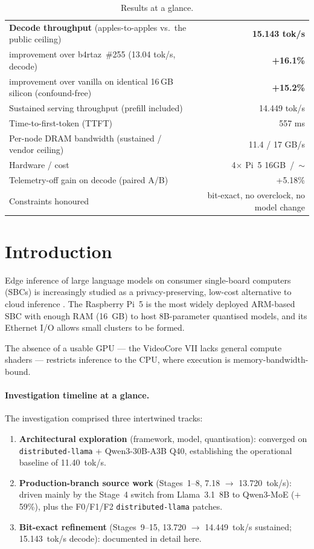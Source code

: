 \documentclass[10pt,a4paper]{article}
\providecommand{\euro}{}\renewcommand{\euro}{\texteuro}
\begin{document}
\begin{table}[h]
\centering
\small
\caption{Results at a glance.}
\begin{tabular}{@{}lr@{}}
\toprule
\textbf{Decode throughput} (apples-to-apples vs.\ the public ceiling) & \textbf{15.143 tok/s} \\
\quad improvement over b4rtaz~\#255 (13.04 tok/s, decode) & \textbf{+16.1\%} \\
\quad improvement over vanilla on identical 16\,GB silicon (confound-free) & \textbf{+15.2\%} \\
Sustained serving throughput (prefill included) & 14.449 tok/s \\
Time-to-first-token (TTFT) & 557 ms \\
Per-node DRAM bandwidth (sustained / vendor ceiling) & 11.4 / 17 GB/s \\
Hardware / cost & 4$\times$ Pi~5 16GB\, /\, $\sim$\euro500 \\
Telemetry-off gain on decode (paired A/B) & +5.18\% \\
Constraints honoured & bit-exact, no overclock, no model change \\
\bottomrule
\end{tabular}
\end{table}

\section{Introduction}

Edge inference of large language models on consumer single-board computers (SBCs) is increasingly studied as a privacy-preserving, low-cost alternative to cloud inference \cite{geerling2025,stratosphere2025}. The Raspberry Pi~5 is the most widely deployed ARM-based SBC with enough RAM (16~GB) to host 8B-parameter quantised models, and its Ethernet I/O allows small clusters to be formed.

The absence of a usable GPU --- the VideoCore VII lacks general compute shaders --- restricts inference to the CPU, where execution is memory-bandwidth-bound.

\paragraph{Investigation timeline at a glance.}
The investigation comprised three intertwined tracks:
\begin{enumerate}[label=(\roman*),leftmargin=2.2em]
  \item \textbf{Architectural exploration} (framework, model, quantisation): converged on \texttt{distributed-llama} + Qwen3-30B-A3B Q40, establishing the operational baseline of 11.40~tok/s.
  \item \textbf{Production-branch source work} (Stages~1--8, 7.18 $\to$ 13.720~tok/s): driven mainly by the Stage~4 switch from Llama~3.1~8B to Qwen3-MoE ($+$59\%), plus the F0/F1/F2 \texttt{distributed-llama} patches.
  \item \textbf{Bit-exact refinement} (Stages~9--15, 13.720 $\to$ 14.449~tok/s sustained; 15.143~tok/s decode): documented in detail here.
\end{enumerate}
\end{document}
